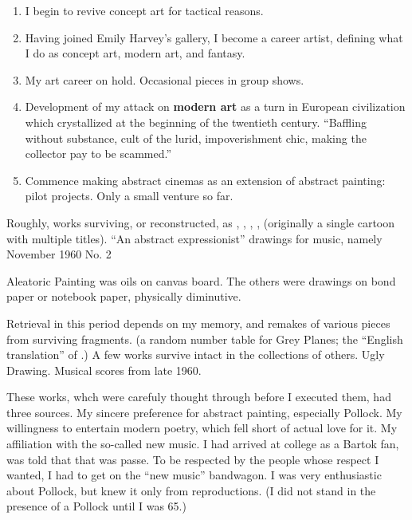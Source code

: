 \begin{enumerate}[label=\Alph*]
\item {}  I begin to revive concept art for tactical reasons.

\item {}  Having joined Emily Harvey's gallery, I become a career artist, defining what I do as concept art, modern art, and fantasy.

\item {}  My art career on hold.  Occasional pieces in group shows. 

\item {}  Development of my attack on \textbf{modern art} as a turn in European civilization which crystallized at the beginning of the twentieth century.  \enquote{Baffling without substance, cult of the lurid, impoverishment chic, making the collector pay to be scammed.}

\item {}  Commence making abstract cinemas as an extension of abstract painting:  pilot projects.  Only a small venture so far.
\end{enumerate}
 
\Db
 

Roughly, works surviving, or reconstructed, as , , , ,  (originally a single cartoon with multiple titles).  \enquote{An abstract expressionist} drawings for music, namely November 1960 No. 2 \scalebox{0.9}{[survives].}

Aleatoric Painting was oils on canvas board.  The others were drawings on bond paper or notebook paper, physically diminutive.

Retrieval in this period depends on my memory, and remakes of various pieces from surviving fragments.  (a random number table for Grey Planes; the \enquote{English translation} of .)  A few works survive intact in the collections of others.  Ugly Drawing.  Musical scores from late 1960.

These works, whch were carefuly thought through before I executed them, had three sources.  My sincere preference for abstract painting, especially Pollock.  My willingness to entertain modern poetry, which fell short of actual love for it.  My affiliation with the so-called new music.  I had arrived at college as a Bartok fan, was told that that was passe.  To be respected by the people whose respect I wanted, I had to get on the \enquote{new music} bandwagon.  I was very enthusiastic about Pollock, but knew it only from reproductions.  (I did not stand in the presence of a Pollock until I was 65.)

